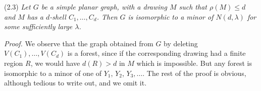 
\stmt
(2.3) \textit{Let $G$ be a simple planar graph, with a drawing $M$ such that $\rho(M) \le d$ and $M$ has a $d$-shell $C_1, \dots, C_d$. Then $G$ is isomorphic to a minor of $N(d, \lambda)$ for some sufficiently large $\lambda$.}

\textit{Proof.} We observe that the graph obtained from $G$ by deleting $V(C_1), \dots, V(C_d)$ is a forest, since if the corresponding drawing had a finite region $R$, we would have $d(R) > d$ in $M$ which is impossible. But any forest is isomorphic to a minor of one of $Y_1$, $Y_2$, $Y_3, \dots$. The rest of the proof is obvious, although tedious to write out, and we omit it.

